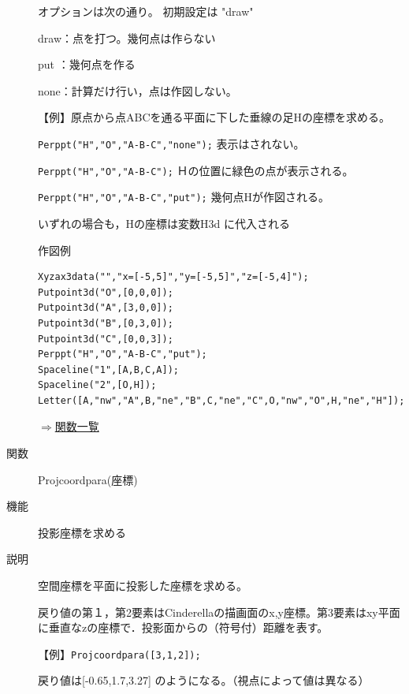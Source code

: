 \documentclass[papersize,a4paper,12pt,uplatex]{jsarticle}
\begin{document}
\begin{description}
オプションは次の通り。 初期設定は "draw"

draw：点を打つ。幾何点は作らない

put ：幾何点を作る

none：計算だけ行い，点は作図しない。

\vspace{\baselineskip}
【例】原点から点ABCを通る平面に下した垂線の足Hの座標を求める。

 \verb|Perppt("H","O","A-B-C","none");| 表示はされない。
 
 \verb|Perppt("H","O","A-B-C");| Ｈの位置に緑色の点が表示される。
 
 \verb|Perppt("H","O","A-B-C","put");| 幾何点Hが作図される。
 
いずれの場合も，Hの座標は変数H3d に代入される

\vspace{\baselineskip}
作図例
\begin{verbatim}
Xyzax3data("","x=[-5,5]","y=[-5,5]","z=[-5,4]");
Putpoint3d("O",[0,0,0]);
Putpoint3d("A",[3,0,0]);
Putpoint3d("B",[0,3,0]);
Putpoint3d("C",[0,0,3]);
Perppt("H","O","A-B-C","put");
Spaceline("1",[A,B,C,A]);
Spaceline("2",[O,H]);
Letter([A,"nw","A",B,"ne","B",C,"ne","C",O,"nw","O",H,"ne","H"]);
\end{verbatim}

\begin{center}\scalebox{0.9}{ } \end{center}

\begin{flushright} \hyperlink{functionlist}{$\Rightarrow$関数一覧}\end{flushright}

\hypertarget{projcoordpara}{}
\item[関数]Projcoordpara(座標)
\item[機能]投影座標を求める
\item[説明]空間座標を平面に投影した座標を求める。

戻り値の第１，第2要素はCinderellaの描画面のx,y座標。第3要素はxy平面に垂直なzの座標で．投影面からの（符号付）距離を表す。

\vspace{\baselineskip}
【例】\verb|Projcoordpara([3,1,2]);|

 戻り値は[-0.65,1.7,3.27] のようになる。（視点によって値は異なる）



\end{description}
\end{document}
